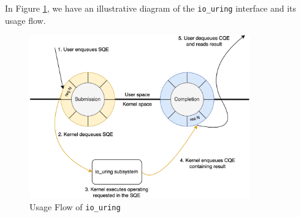 In Figure \ref{fig:uring_illustrated}, we have an illustrative diagram of the \texttt{io\_uring} interface and its usage flow.

\begin{figure}[ht]
    \centering
	\includegraphics[width=0.85\textwidth]{figures/graphics/uring_illustrated.png}
	\caption[Usage Flow of \texttt{io\_uring}]{
      Usage Flow of \texttt{io\_uring}
	}
	\label{fig:uring_illustrated}
\end{figure} 
